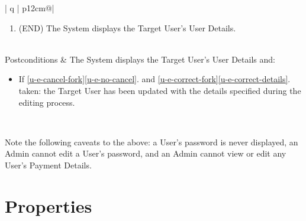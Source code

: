 \begin{table}[H]
\begin{tabular}{| q | p{12cm}@\qquad |}
\begin{enumerate}
\begin{enumerate}
                \item \label{u-e-correct-details} If the User Details are Correct: the System updates the Target User based on the details provided.
                \item \label{u-e-incorrect-details} If the User Details are not Correct: the System displays a notification about the details causing the problem. Return to 2.
            \end{enumerate}
            \item \label{u-e-end} (END) The System displays the Target User's User Details.
        \end{enumerate}
        \\ \hline
        Postconditions & 
            The System displays the Target User's User Details and:
            \begin{itemize}
                \item If \ref{u-e-cancel-fork}\ref{u-e-no-cancel}. and \ref{u-e-correct-fork}\ref{u-e-correct-details}. taken: the Target User has been updated with the details specified during the editing process.
            \end{itemize}
         \\ \hline
    \end{tabular}
    \caption{Use Case U-E: Edit User}
    \label{use_case_u-e}
  \end{table}

  Note the following caveats to the above: a User's password is never displayed, an Admin cannot edit a User's password, and an Admin cannot view or edit any User's Payment Details.

  \section{Properties}

